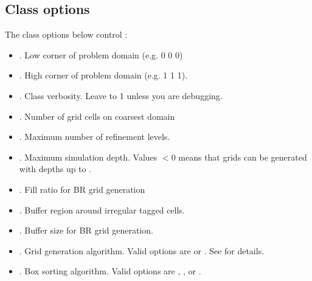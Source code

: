 \documentclass[letterpaper,10pt,english]{sphinxmanual}
\begin{document}
\subsection{Class options}
\label{\detokenize{Source/AmrMesh:class-options}}
The class options below control :
\begin{itemize}
\item {} 
. Low corner of problem domain (e.g. 0 0 0)

\item {} 
. High corner of problem domain (e.g. 1 1 1).

\item {} 
. Class verbosity. Leave to \sphinxhyphen{}1 unless you are debugging.

\item {} 
. Number of grid cells on coarsest domain

\item {} 
. Maximum number of refinement levels.

\item {} 
. Maximum simulation depth.
Values \(< 0\) means that grids can be generated with depths up to .

\item {} 
. Fill ratio for BR grid generation

\item {} 
. Buffer region around irregular tagged cells.

\item {} 
. Buffer size for BR grid generation.

\item {} 
. Grid generation algorithm. Valid options are  or . See {\hyperref[\detokenize{Source/SpatialDiscretization:chap-meshgeneration}]{}} for details.

\item {} 
. Box sorting algorithm. Valid options are , , or .


\end{itemize}
\end{document}
